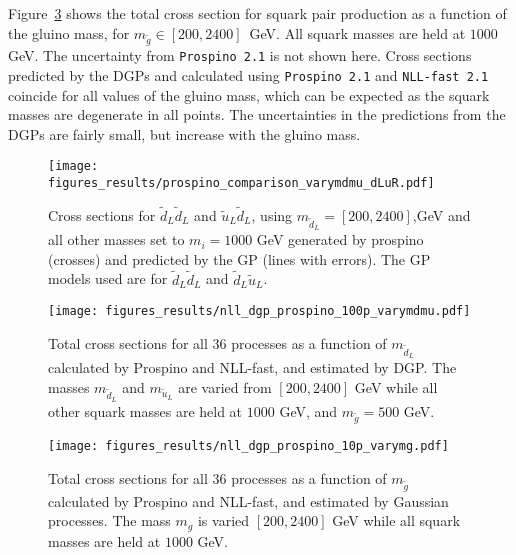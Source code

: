 \documentclass[twoside,english]{uiofysmaster}
\begin{document}
{Figure~\ref{Fig:: results : Total cross sections varymg dgp prospino nll} shows the total cross section for squark pair production as a function of the gluino mass, for $m_{\widetilde{g}} \in [200, 2400]$~GeV. All squark masses are held at $1000$ GeV. The uncertainty from \verb|Prospino 2.1| is not shown here. Cross sections predicted by the DGPs and calculated using \verb|Prospino 2.1| and \verb|NLL-fast 2.1| coincide for all values of the gluino mass, which can be expected as the squark masses are degenerate in all points. The uncertainties in the predictions from the DGPs are fairly small, but increase with the gluino mass. 


\begin{figure}
\centering
\texttt{[image: figures\_results/prospino\_comparison\_varymdmu\_dLuR.pdf]}
\caption{Cross sections for $\widetilde{d}_L \widetilde{d}_L$ and $\widetilde{u}_L \widetilde{d}_L$, using $m_{\widetilde{d}_L}=[200, 2400]$,GeV and all other masses set to $m_i = 1000$ GeV generated by prospino (crosses) and predicted by the GP (lines with errors). The GP models used are for $\widetilde{d}_L \widetilde{d}_L$ and $\widetilde{d}_L \widetilde{u}_L$.}
\label{Fig:: results : dLuL uLuL prospino dgp}
\end{figure}


\begin{figure}
\centering
\texttt{[image: figures\_results/nll\_dgp\_prospino\_100p\_varymdmu.pdf]}
\caption{Total cross sections for all 36 processes as a function of $m_{\widetilde{d}_L}$ calculated by Prospino and NLL-fast, and estimated by DGP. The masses $m_{\widetilde{d}_L}$ and $m_{\widetilde{u}_L}$ are varied from $[200, 2400]$ GeV while all other squark masses are held at $1000$ GeV, and $m_{\widetilde{g}}=500$ GeV.}
\label{Fig:: results : Total cross sections dgp prospino nll}
\end{figure}

\begin{figure}
\centering
\texttt{[image: figures\_results/nll\_dgp\_prospino\_10p\_varymg.pdf]}
\caption{Total cross sections for all 36 processes as a function of $m_{\widetilde{g}}$ calculated by Prospino and NLL-fast, and estimated by Gaussian processes. The mass $m_{g}$ is varied $[200, 2400]$ GeV while all squark masses are held at $1000$ GeV.}
\label{Fig:: results : Total cross sections varymg dgp prospino nll}
\end{figure}





}
\end{document}
